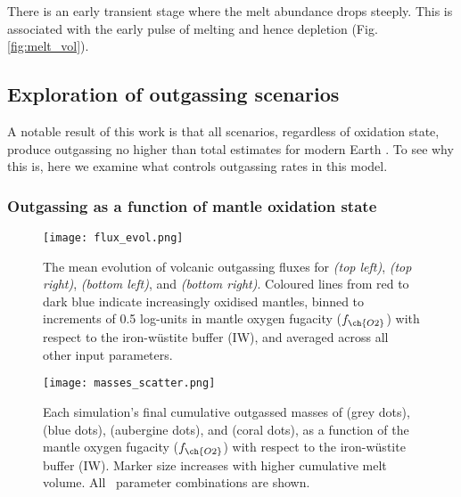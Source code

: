 There is an early transient stage where the melt abundance drops steeply. This is associated with the early pulse of melting and hence depletion (Fig. \ref{fig:melt_vol}). 

\subsection{Exploration of outgassing scenarios}



A notable result of this work is that all scenarios, regardless of oxidation state, produce outgassing no higher than total estimates for modern Earth \citep[e.g.,][]{Catling2017}. To see why this is, here we examine what controls outgassing rates in this model.

\subsubsection{Outgassing as a function of mantle oxidation state}


\begin{figure}
    \centering
    \texttt{[image: flux\_evol.png]}
    \caption[Modelled evolution of outgassing fluxes of , , , and  for Archean Earth.]{The mean evolution of volcanic outgassing fluxes for  \textit{(top left)},  \textit{(top right)},  \textit{(bottom left)}, and  \textit{(bottom right)}. Coloured lines from red to dark blue indicate increasingly oxidised mantles, binned to increments of 0.5 log-units in mantle oxygen fugacity ($f_{\ch{O2}}$) with respect to the iron-w\"ustite buffer (IW), and averaged across all other input parameters. }
    \label{fig:fO2_flux}
\end{figure}

\begin{figure}
    \centering
    \texttt{[image: masses\_scatter.png]}
    \caption[Total cumulative outgassed masses of , , , and , as a function of \fo.]{Each simulation's final cumulative outgassed masses of  (grey dots),  (blue dots),  (aubergine dots), and  (coral dots), as a function of the mantle oxygen fugacity ($f_{\ch{O2}}$) with respect to the iron-w\"ustite buffer (IW). Marker size increases with higher cumulative melt volume. All \Ncases~parameter combinations are shown.}
    \label{fig:fO2_scatter}
\end{figure}

